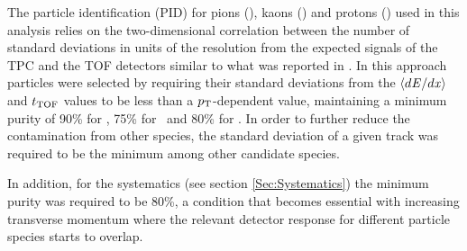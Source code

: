 \documentclass[ALICE,manyauthors]{cernphprep}
\begin{document}

The particle identification (PID) for pions (\pion), kaons (\kaon) and protons (\proton) used in this analysis relies on the two-dimensional correlation between the number of standard deviations in units of the resolution from the expected signals of the TPC and the TOF detectors similar to what was reported in \cite{Abelev:2014pua,Adam:2016nfo,Acharya:2018zuq}. In this approach particles were selected by requiring their standard deviations from the $\langle d{\it E}/d{\it x}\rangle$ and $t_{\rm TOF}$ values to be less than a $p_{\rm T}$-dependent value, maintaining a minimum purity of 90\% for \pion, 75\% for \kaon~and 80\% for \proton. In order to further reduce the contamination from other species, the standard deviation of a given track was required to be the minimum among other candidate species. 



In addition, for the systematics (see section \ref{Sec:Systematics}) the minimum purity was required to be 80\%, a condition that becomes essential with increasing transverse momentum where the relevant detector response for different particle species starts to overlap.
\end{document}
